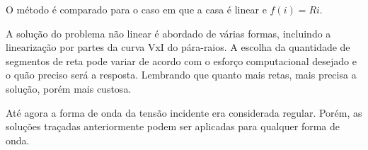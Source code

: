 O método é comparado para o caso em que a casa é linear e $f(i) = Ri$.

A solução do problema não linear é abordado de várias formas, incluindo a linearização por partes da curva VxI do pára-raios. A escolha da quantidade de segmentos de reta pode variar de acordo com o esforço computacional desejado e o quão preciso será a resposta. Lembrando que quanto mais retas, mais precisa a solução, porém mais custosa.

Até agora a forma de onda da tensão incidente era considerada regular. Porém, as soluções traçadas anteriormente podem ser aplicadas para qualquer forma de onda.


